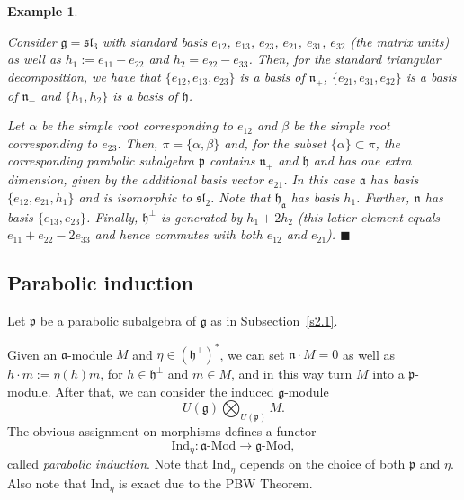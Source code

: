 \documentclass[a4paper]{amsart}
\newtheorem{example}[theorem]{Example}
\begin{document}
\begin{example}\label{ex-s2.1-1}
{\em Consider $\mathfrak{g}=\mathfrak{sl}_3$ with standard basis
$e_{12}$, $e_{13}$, $e_{23}$, $e_{21}$, $e_{31}$, $e_{32}$
(the matrix units) as well as $h_1:=e_{11}-e_{22}$
and $h_2=e_{22}-e_{33}$. Then, for the standard triangular
decomposition, we have that $\{e_{12},e_{13},e_{23}\}$
is a basis of $\mathfrak{n}_+$, $\{e_{21},e_{31},e_{32}\}$
is a basis of $\mathfrak{n}_-$ and $\{h_1,h_2\}$ is a
basis of $\mathfrak{h}$.

Let $\alpha$ be the simple root corresponding to $e_{12}$
and $\beta$ be the simple root corresponding to $e_{23}$.
Then, $\pi=\{\alpha,\beta\}$ and, for the subset 
$\{\alpha\}\subset\pi$, the corresponding parabolic
subalgebra $\mathfrak{p}$ contains $\mathfrak{n}_+$
and $\mathfrak{h}$ and has one extra dimension, given
by the additional basis vector $e_{21}$. In this case
$\mathfrak{a}$ has basis $\{e_{12},e_{21},h_1\}$
and is isomorphic to $\mathfrak{sl}_2$. Note that
$\mathfrak{h}_\mathfrak{a}$ has basis $h_1$.
Further,
$\mathfrak{n}$ has basis $\{e_{13},e_{23}\}$. Finally,
$\mathfrak{h}^{\perp}$ is generated by $h_1+2h_2$
(this latter element equals $e_{11}+e_{22}-2e_{33}$
and hence commutes with both $e_{12}$ and $e_{21}$).
\hfill$\blacksquare$
}
\end{example}

\subsection{Parabolic induction}\label{s2.2}

Let $\mathfrak{p}$ be a parabolic subalgebra of $\mathfrak{g}$
as in Subsection~\ref{s2.1}. 

Given an $\mathfrak{a}$-module $M$ and $\eta\in(\mathfrak{h}^{\perp})^*$,
we can set $\mathfrak{n}\cdot M=0$ as well as
$h\cdot m:=\eta(h)m$, for $h\in \mathfrak{h}^{\perp}$
and $m\in M$, and in this way turn $M$
into a $\mathfrak{p}$-module. After that, we can consider the 
induced $\mathfrak{g}$-module
\begin{displaymath}
U(\mathfrak{g})\bigotimes_{U(\mathfrak{p})}M.
\end{displaymath}
The obvious assignment on morphisms defines a functor
\begin{displaymath}
\mathrm{Ind}_{\eta}:\mathfrak{a}\text{-}\mathrm{Mod}\to
\mathfrak{g}\text{-}\mathrm{Mod},
\end{displaymath}
called {\em parabolic induction}. Note that $\mathrm{Ind}_{\eta}$
depends on the choice of both $\mathfrak{p}$ and $\eta$.
Also note that $\mathrm{Ind}_{\eta}$ is exact due to the 
PBW Theorem.
\end{document}
